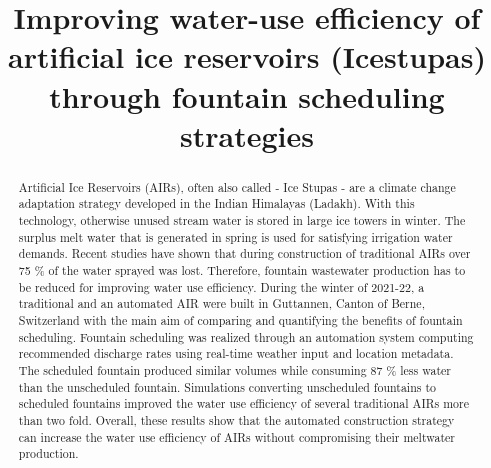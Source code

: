 \documentclass[tc, manuscript]{copernicus}
\begin{document}
\title{Improving water-use efficiency of artificial ice reservoirs (Icestupas) through fountain scheduling
strategies}

\def\Authors{Suryanarayanan Balasubramanian\,$^{1,2}$, Martin Hoelzle\,$^{1}$Roger Waser\,$^{3}$}

\def\Address{$^{1}$University of Fribourg, Department of Geosciences, Fribourg, Switzerland $^{2}$University of
Applied Sciences and Arts, Luzern, Switzerland} \def\corrAuthor{Suryanarayanan Balasubramanian}





\maketitle

\begin{abstract}

  Artificial Ice Reservoirs (AIRs), often also called - Ice Stupas - are a climate change adaptation strategy
  developed in the Indian Himalayas (Ladakh). With this technology, otherwise unused stream water is stored in
  large ice towers in winter. The surplus melt water that is generated in spring is used for satisfying
  irrigation water demands. Recent studies have shown that during construction of traditional AIRs over 75 \% of
  the water sprayed was lost. Therefore, fountain wastewater production has to be reduced for improving water
  use efficiency.  During the winter of 2021-22, a traditional and an automated AIR were built in Guttannen,
  Canton of Berne, Switzerland with the main aim of comparing and quantifying the benefits of fountain
  scheduling. Fountain scheduling was realized through an automation system computing recommended discharge
  rates using real-time weather input and location metadata. The scheduled fountain produced similar volumes
  while consuming 87 \% less water than the unscheduled fountain. Simulations converting unscheduled fountains
  to scheduled fountains improved the water use efficiency of several traditional AIRs more than two fold.
  Overall, these results show that the automated construction strategy can increase the water use efficiency of
  AIRs without compromising their meltwater production.

\end{abstract}
\end{document}
